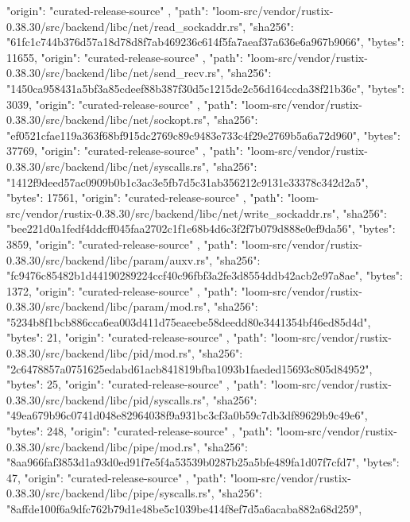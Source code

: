 {{      "origin": "curated-release-source"
    },
    {
      "path": "loom-src/vendor/rustix-0.38.30/src/backend/libc/net/read_sockaddr.rs",
      "sha256": "61fc1c744b376d57a18d78d8f7ab469236c614f5fa7aeaf37a636e6a967b9066",
      "bytes": 11655,
      "origin": "curated-release-source"
    },
    {
      "path": "loom-src/vendor/rustix-0.38.30/src/backend/libc/net/send_recv.rs",
      "sha256": "1450ca958431a5bf3a85cdeef88b387f30d5c1215de2c56d164ccda38f21b36c",
      "bytes": 3039,
      "origin": "curated-release-source"
    },
    {
      "path": "loom-src/vendor/rustix-0.38.30/src/backend/libc/net/sockopt.rs",
      "sha256": "ef0521cfae119a363f68bf915dc2769c89c9483e733c4f29e2769b5a6a72d960",
      "bytes": 37769,
      "origin": "curated-release-source"
    },
    {
      "path": "loom-src/vendor/rustix-0.38.30/src/backend/libc/net/syscalls.rs",
      "sha256": "1412f9deed57ac0909b0b1c3ac3e5fb7d5c31ab356212c9131e33378c342d2a5",
      "bytes": 17561,
      "origin": "curated-release-source"
    },
    {
      "path": "loom-src/vendor/rustix-0.38.30/src/backend/libc/net/write_sockaddr.rs",
      "sha256": "bee221d0a1fedf4ddcff045faa2702c1f1e68b4d6c3f2f7b079d888e0ef9da56",
      "bytes": 3859,
      "origin": "curated-release-source"
    },
    {
      "path": "loom-src/vendor/rustix-0.38.30/src/backend/libc/param/auxv.rs",
      "sha256": "fc9476c85482b1d44190289224ccf40c96fbf3a2fe3d8554ddb42acb2e97a8ae",
      "bytes": 1372,
      "origin": "curated-release-source"
    },
    {
      "path": "loom-src/vendor/rustix-0.38.30/src/backend/libc/param/mod.rs",
      "sha256": "5234b8f1bcb886cca6ea003d411d75eaeebe58deedd80e3441354bf46ed85d4d",
      "bytes": 21,
      "origin": "curated-release-source"
    },
    {
      "path": "loom-src/vendor/rustix-0.38.30/src/backend/libc/pid/mod.rs",
      "sha256": "2c6478857a0751625edabd61acb841819bfba1093b1faeded15693c805d84952",
      "bytes": 25,
      "origin": "curated-release-source"
    },
    {
      "path": "loom-src/vendor/rustix-0.38.30/src/backend/libc/pid/syscalls.rs",
      "sha256": "49ea679b96c0741d048e82964038f9a931bc3cf3a0b59c7db3df89629b9c49e6",
      "bytes": 248,
      "origin": "curated-release-source"
    },
    {
      "path": "loom-src/vendor/rustix-0.38.30/src/backend/libc/pipe/mod.rs",
      "sha256": "8aa966faf3853d1a93d0ed91f7e5f4a53539b0287b25a5bfe489fa1d07f7cfd7",
      "bytes": 47,
      "origin": "curated-release-source"
    },
    {
      "path": "loom-src/vendor/rustix-0.38.30/src/backend/libc/pipe/syscalls.rs",
      "sha256": "8affde100f6a9dfc762b79d1e48be5c1039be414f8ef7d5a6acaba882a68d259",
}}
